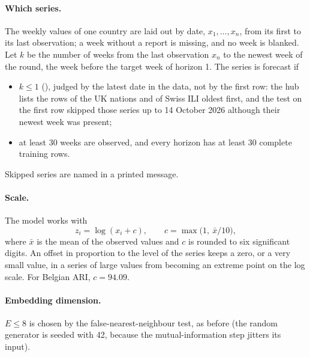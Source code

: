 \documentclass[11pt,a4paper]{article}
\newcommand{\code}[1]{\texttt{\detokenize{#1}}}
\numberwithin{equation}{section}
\begin{document}
\paragraph{Which series.} The weekly values of one country are laid out by date, $x_1,\dots,x_n$,
from its first to its last observation; a week without a report is missing, and no week is blanked.
Let $k$ be the number of weeks from the last observation $x_n$ to the newest week of the round, the
week before the target week of horizon 1. The series is forecast if
\begin{itemize}
\item $k\le1$ (\code{respi_edm.MAX_WEEKS_MISSING}), judged by the latest date in the data, not by the
first row: the hub lists the rows of the UK nations and of Swiss ILI oldest first, and the test on the
first row skipped those series up to 14 October 2026 although their newest week was present;
\item at least 30 weeks are observed, and every horizon has at least 30 complete training rows.
\end{itemize}
Skipped series are named in a printed message.

\paragraph{Scale.} The model works with
\begin{equation}
z_i=\log(x_i+c),\qquad c=\max\bigl(1,\ \bar x/10\bigr),
\label{eq:logscale}
\end{equation}
where $\bar x$ is the mean of the observed values and $c$ is rounded to six significant digits. An
offset in proportion to the level of the series keeps a zero, or a very small value, in a series of
large values from becoming an extreme point on the log scale. For Belgian ARI, $c=94.09$.

\paragraph{Embedding dimension.} $E\le8$ is chosen by the false-nearest-neighbour test, as before
(the random generator is seeded with 42, because the mutual-information step jitters its input).
\end{document}
